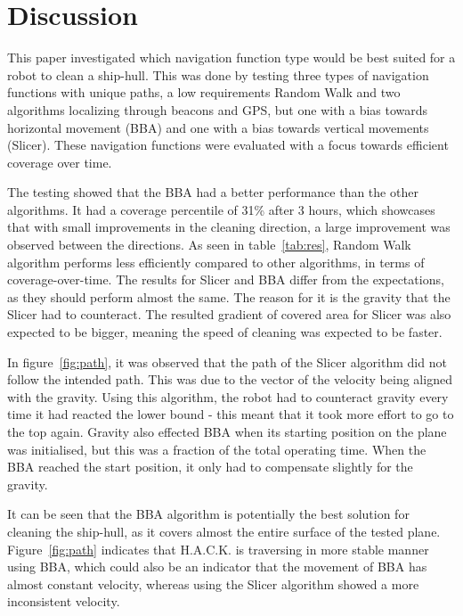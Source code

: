 \section{Discussion}
This paper investigated which navigation function type would be best suited for a robot to clean a ship-hull. This was done by testing three types of navigation functions with unique paths, a low requirements Random Walk and two algorithms localizing through beacons and GPS, but one with a bias towards horizontal movement (BBA) and one with a bias towards vertical movements (Slicer). These navigation functions were evaluated with a focus towards efficient coverage over time. 

The testing showed that the BBA had a better performance than the other algorithms. It had a coverage percentile of 31\% after 3 hours, which showcases that with small improvements in the cleaning direction, a large improvement was observed between the directions. 
As seen in table~\ref{tab:res}, Random Walk algorithm performs less efficiently compared to other algorithms, in terms of coverage-over-time. The results for Slicer and BBA differ from the expectations, as they should perform almost the same. The reason for it is the gravity that the Slicer had to counteract. The resulted gradient of covered area for Slicer was also expected to be bigger, meaning the speed of cleaning was expected to be faster. 




In figure~\ref{fig:path}, it was observed that the path of the Slicer algorithm did not follow the intended path. This was due to the vector of the velocity being aligned with the gravity. Using this algorithm, the robot had to counteract gravity every time it had reacted the lower bound - this meant that it took more effort to go to the top again. Gravity also effected BBA when its starting position on the plane was initialised, but this was a fraction of the total operating time. When the BBA reached the start position, it only had to compensate slightly for the gravity.

It can be seen that the BBA algorithm is potentially the best solution for cleaning the ship-hull, as it covers almost the entire surface of the tested plane.
Figure~\ref{fig:path} indicates that H.A.C.K. is traversing in more stable manner using BBA, which could also be an indicator that the movement of BBA has almost constant velocity, whereas using the Slicer algorithm showed a more inconsistent velocity.

